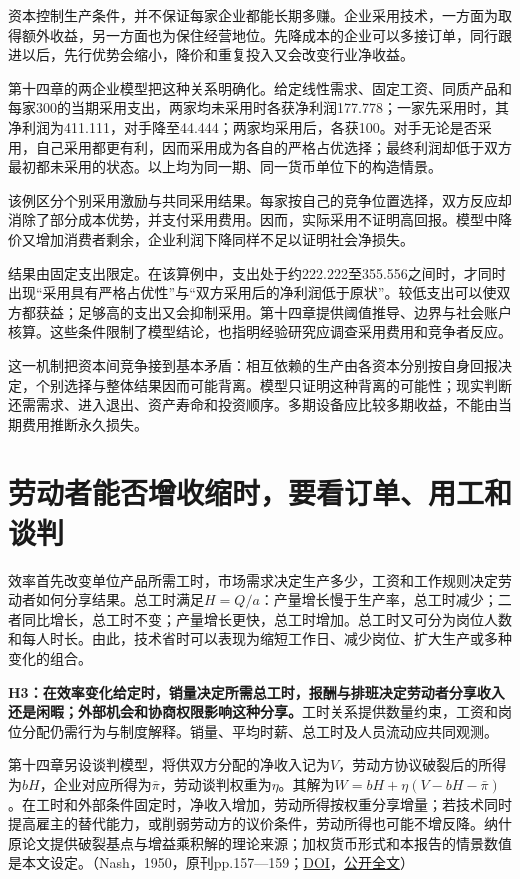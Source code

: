 \documentclass[UTF8,fontset=windows,12pt,a4paper,oneside,openany]{ctexbook}
\begin{document}
资本控制生产条件，并不保证每家企业都能长期多赚。企业采用技术，一方面为取得额外收益，另一方面也为保住经营地位。先降成本的企业可以多接订单，同行跟进以后，先行优势会缩小，降价和重复投入又会改变行业净收益。

第十四章的两企业模型把这种关系明确化。给定线性需求、固定工资、同质产品和每家300的当期采用支出，两家均未采用时各获净利润177.778；一家先采用时，其净利润为411.111，对手降至44.444；两家均采用后，各获100。对手无论是否采用，自己采用都更有利，因而采用成为各自的严格占优选择；最终利润却低于双方最初都未采用的状态。以上均为同一期、同一货币单位下的构造情景。

该例区分个别采用激励与共同采用结果。每家按自己的竞争位置选择，双方反应却消除了部分成本优势，并支付采用费用。因而，实际采用不证明高回报。模型中降价又增加消费者剩余，企业利润下降同样不足以证明社会净损失。

结果由固定支出限定。在该算例中，支出处于约222.222至355.556之间时，才同时出现“采用具有严格占优性”与“双方采用后的净利润低于原状”。较低支出可以使双方都获益；足够高的支出又会抑制采用。第十四章提供阈值推导、边界与社会账户核算。这些条件限制了模型结论，也指明经验研究应调查采用费用和竞争者反应。

这一机制把资本间竞争接到基本矛盾：相互依赖的生产由各资本分别按自身回报决定，个别选择与整体结果因而可能背离。模型只证明这种背离的可能性；现实判断还需需求、进入退出、资产寿命和投资顺序。多期设备应比较多期收益，不能由当期费用推断永久损失。

\section{劳动者能否增收缩时，要看订单、用工和谈判}

效率首先改变单位产品所需工时，市场需求决定生产多少，工资和工作规则决定劳动者如何分享结果。总工时满足$H=Q/a$：产量增长慢于生产率，总工时减少；二者同比增长，总工时不变；产量增长更快，总工时增加。总工时又可分为岗位人数和每人时长。由此，技术省时可以表现为缩短工作日、减少岗位、扩大生产或多种变化的组合。

\textbf{H3：在效率变化给定时，销量决定所需总工时，报酬与排班决定劳动者分享收入还是闲暇；外部机会和协商权限影响这种分享。}工时关系提供数量约束，工资和岗位分配仍需行为与制度解释。销量、平均时薪、总工时及人员流动应共同观测。

第十四章另设谈判模型，将供双方分配的净收入记为$V$，劳动方协议破裂后的所得为$bH$，企业对应所得为$\bar\pi$，劳动谈判权重为$\eta$。其解为$W=bH+\eta(V-bH-\bar\pi)$。在工时和外部条件固定时，净收入增加，劳动所得按权重分享增量；若技术同时提高雇主的替代能力，或削弱劳动方的议价条件，劳动所得也可能不增反降。纳什原论文提供破裂基点与增益乘积解的理论来源；加权货币形式和本报告的情景数值是本文设定。（Nash，1950，原刊pp.157—159；\href{https://doi.org/10.2307/1907266}{DOI}，\href{https://www.haverford.edu/sites/default/files/Nash1950.pdf}{公开全文}）
\end{document}
